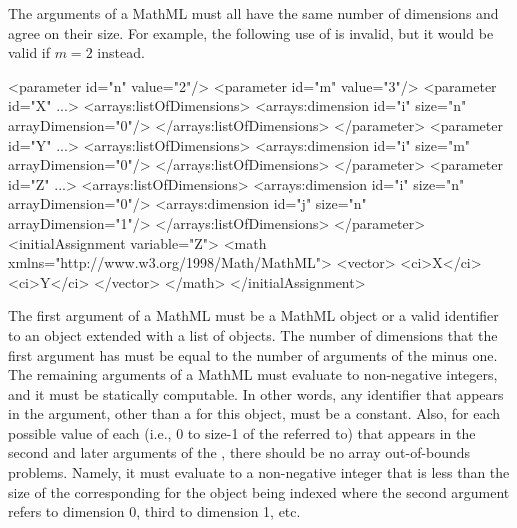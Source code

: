 The arguments of a MathML  must all have the same number of dimensions and agree on their size.  For example, the following use of  is invalid, but it would be valid if $m=2$ instead.
\begin{example}
<parameter id="n" value="2"/>
<parameter id="m" value="3"/>
<parameter id="X" ...>
  <arrays:listOfDimensions>
    <arrays:dimension id="i" size="n" arrayDimension="0"/>
  </arrays:listOfDimensions>
</parameter>
<parameter id="Y" ...>
  <arrays:listOfDimensions>
    <arrays:dimension id="i" size="m" arrayDimension="0"/>
  </arrays:listOfDimensions>
</parameter>
<parameter id="Z" ...>
  <arrays:listOfDimensions>
    <arrays:dimension id="i" size="n" arrayDimension="0"/>
    <arrays:dimension id="j" size="n" arrayDimension="1"/>
  </arrays:listOfDimensions>
</parameter>
<initialAssignment variable="Z"> 
 <math xmlns="http://www.w3.org/1998/Math/MathML">
  <vector> 
   <ci>X</ci> 
   <ci>Y</ci>
  </vector>
 </math>
</initialAssignment>
\end{example}

The first argument of a MathML  must be a MathML  object or a valid identifier to an \SBase object extended with a list of \Dimension objects.  The number of dimensions that the first argument has must be equal to the number of arguments of the  minus one. The remaining arguments of a MathML  must evaluate to non-negative integers, and it must be statically computable.  In other words, any identifier that appears in the argument, other than a \Dimension {} for this object, must be a constant.  Also, for each possible value of each \Dimension {} (i.e., 0 to size-1 of the \Dimension referred to) that appears in the second and later arguments of the ,  there should be no array out-of-bounds problems.  Namely, it must evaluate to a non-negative integer that is less than the size of the corresponding \Dimension for the object being indexed where the second argument refers to dimension 0, third to dimension 1, etc.

